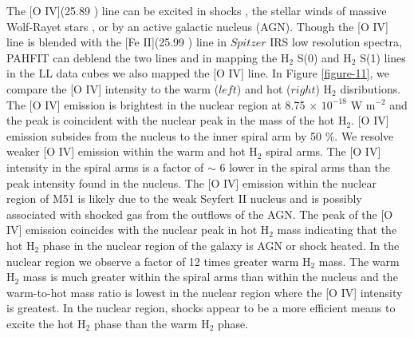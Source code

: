 \documentclass[manuscript]{aastex}
\begin{document}
The [O IV](25.89 \micron) line can be excited in shocks \citep{ss99},
the stellar winds of massive Wolf-Rayet stars \citep{lutz98}, or by an
active galactic nucleus (AGN)\citep{smi04}.  Though the [O IV] line is
blended with the [Fe II](25.99 \micron) line in $Spitzer$ IRS low
resolution spectra, PAHFIT can deblend the two lines and in mapping
the $\mathrm{H_2}$ S(0) and $\mathrm{H_2}$ S(1) lines in the LL data
cubes we also mapped the [O IV] line.  In Figure \ref{figure-11}, we compare 
the [O IV] intensity to the warm ($left$) and hot ($right$) $\mathrm{H_2}$ disributions.  
The [O IV] emission is brightest in the nuclear region at 8.75 $\times$
$\mathrm{10^{-18}}$ W $\mathrm{m^{-2}}$ and the peak is coincident with
the nuclear peak in the mass of the hot $\mathrm{H_2}$.  [O IV]
emission subsides from the nucleus to the inner spiral arm by 50 \%.
We resolve weaker [O IV] emission within the warm and hot
$\mathrm{H_2}$ spiral arms.  The [O IV] intensity in the spiral arms
is a factor of $\sim$ 6 lower in the spiral arms than the peak
intensity found in the nucleus.  The [O IV] emission within the nuclear 
region of M51 is likely due to the weak Seyfert II nucleus \citep{ford85} 
and is possibly associated with shocked gas from the outflows of the AGN.  
The peak of the [O IV] emission coincides with the nuclear peak in hot 
$\mathrm{H_2}$ mass indicating that the hot $\mathrm{H_2}$ phase in the 
nuclear region of the galaxy is AGN or shock heated. 
In the nuclear region we observe a factor of 12 times greater
warm $\mathrm{H_2}$ mass.  The warm $\mathrm{H_2}$ mass is much
greater within the spiral arms than within the nucleus and the
warm-to-hot mass ratio is lowest in the nuclear region where the [O
  IV] intensity is greatest.  In the nuclear region, shocks appear to
be a more efficient means to excite the hot $\mathrm{H_2}$ phase than
the warm $\mathrm{H_2}$ phase.
\end{document}
